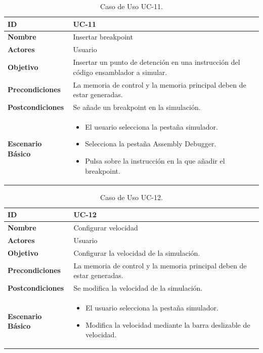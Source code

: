 \begin{center}
\begin{table}[htbp]
\centering
\begin{tabular}{@{}p{2.5cm} p{9cm}@{}} 
\toprule
\textbf{ID}	& UC-11  \\
\midrule
\textbf{Nombre} 		& Insertar breakpoint  \\
\midrule
\textbf{Actores} 		&	Usuario  \\
\midrule
\textbf{Objetivo} 	&	Insertar un punto de detención en una instrucción del código ensamblador a simular.	 \\
\midrule
\textbf{Precondiciones}	&	La memoria de control y la memoria principal deben de estar generadas.  \\
\midrule
\textbf{Postcondiciones} 	& Se añade un breakpoint en la simulación.   \\
\midrule
\textbf{Escenario Básico} 	&  \begin{itemize}
\item El usuario selecciona la pestaña simulador.
\item Selecciona la pestaña Assembly Debugger.
\item Pulsa sobre la instrucción en la que añadir el breakpoint.
\end{itemize} \\
\bottomrule
\end{tabular}
\caption{Caso de Uso UC-11.}
\label{tab:uc11}
\end{table}
\end{center}

\begin{center}
\begin{table}[htbp]
\centering
\begin{tabular}{@{}p{2.5cm} p{9cm}@{}} 
\toprule
\textbf{ID}	& UC-12  \\
\midrule
\textbf{Nombre} 		& Configurar velocidad  \\
\midrule
\textbf{Actores} 		&	Usuario  \\
\midrule
\textbf{Objetivo} 	&	Configurar la velocidad de la simulación.	 \\
\midrule
\textbf{Precondiciones}	&	La memoria de control y la memoria principal deben de estar generadas.  \\
\midrule
\textbf{Postcondiciones} 	& Se modifica la velocidad de la simulación.   \\
\midrule
\textbf{Escenario Básico} 	&  \begin{itemize}
\item El usuario selecciona la pestaña simulador.
\item Modifica la velocidad mediante la barra deslizable de velocidad.
\end{itemize} \\
\bottomrule
\end{tabular}
\caption{Caso de Uso UC-12.}
\label{tab:uc12}
\end{table}
\end{center}

